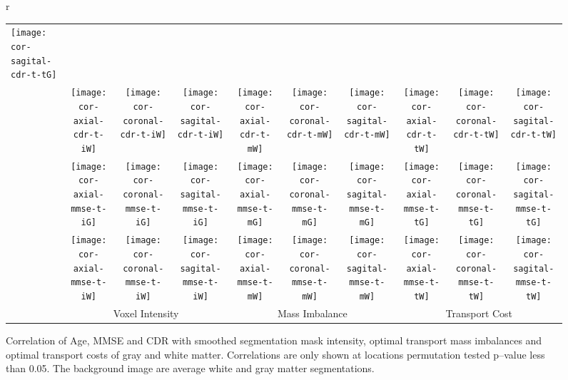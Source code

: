 \begin{figure}[h!]
\begin{tabular}{r}
\begin{tabular}{l||ccc||ccc||ccc}
\texttt{[image: cor-sagital-cdr-t-tG]} 
  \\
  &
\texttt{[image: cor-axial-cdr-t-iW]} &
\texttt{[image: cor-coronal-cdr-t-iW]} &
\texttt{[image: cor-sagital-cdr-t-iW]} &
\texttt{[image: cor-axial-cdr-t-mW]} &
\texttt{[image: cor-coronal-cdr-t-mW]} &
\texttt{[image: cor-sagital-cdr-t-mW]} &
\texttt{[image: cor-axial-cdr-t-tW]} &
\texttt{[image: cor-coronal-cdr-t-tW]} &
\texttt{[image: cor-sagital-cdr-t-tW]} 
  \\ \hline 
  \multirow{2}{*}{\rotatebox[origin=c]{90}{MMSE}} &
\texttt{[image: cor-axial-mmse-t-iG]} &
\texttt{[image: cor-coronal-mmse-t-iG]} &
\texttt{[image: cor-sagital-mmse-t-iG]} &
\texttt{[image: cor-axial-mmse-t-mG]} &
\texttt{[image: cor-coronal-mmse-t-mG]} &
\texttt{[image: cor-sagital-mmse-t-mG]} &
\texttt{[image: cor-axial-mmse-t-tG]} &
\texttt{[image: cor-coronal-mmse-t-tG]} &
\texttt{[image: cor-sagital-mmse-t-tG]} 
  \\ 
  &
\texttt{[image: cor-axial-mmse-t-iW]} &
\texttt{[image: cor-coronal-mmse-t-iW]} &
\texttt{[image: cor-sagital-mmse-t-iW]} &
\texttt{[image: cor-axial-mmse-t-mW]} &
\texttt{[image: cor-coronal-mmse-t-mW]} &
\texttt{[image: cor-sagital-mmse-t-mW]} &
\texttt{[image: cor-axial-mmse-t-tW]} &
\texttt{[image: cor-coronal-mmse-t-tW]} &
\texttt{[image: cor-sagital-mmse-t-tW]} 
  \\ \hline  \hline
  & \multicolumn{3}{c||}{Voxel Intensity}
  & \multicolumn{3}{c||}{Mass Imbalance}
  & \multicolumn{3}{c}{Transport Cost}
\end{tabular}
\end{tabular}
\caption{\label{fig:cor-oasis}
Correlation of Age, MMSE and CDR with smoothed segmentation mask intensity,
optimal transport mass imbalances and optimal transport costs of gray and white
matter.  Correlations are only shown at locations permutation tested p--value
less than 0.05. The background image are average white and gray matter
segmentations. 
\vspace{-7mm}
} 
\end{figure} 
\endgroup


